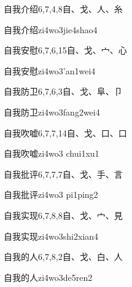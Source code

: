 \begin{Entry}{自我介绍}{6,7,4,8}{⾃、⼽、⼈、⽷}
  \begin{Phonetics}{自我介绍}{zi4wo3jie4shao4}
  \end{Phonetics}
\end{Entry}

\begin{Entry}{自我安慰}{6,7,6,15}{⾃、⼽、⼧、⼼}
  \begin{Phonetics}{自我安慰}{zi4wo3'an1wei4}
  \end{Phonetics}
\end{Entry}

\begin{Entry}{自我防卫}{6,7,6,3}{⾃、⼽、⾩、⼙}
  \begin{Phonetics}{自我防卫}{zi4wo3fang2wei4}
  \end{Phonetics}
\end{Entry}

\begin{Entry}{自我吹嘘}{6,7,7,14}{⾃、⼽、⼝、⼝}
  \begin{Phonetics}{自我吹嘘}{zi4wo3 chui1xu1}
  \end{Phonetics}
\end{Entry}

\begin{Entry}{自我批评}{6,7,7,7}{⾃、⼽、⼿、⾔}
  \begin{Phonetics}{自我批评}{zi4wo3 pi1ping2}
  \end{Phonetics}
\end{Entry}

\begin{Entry}{自我实现}{6,7,8,8}{⾃、⼽、⼧、⾒}
  \begin{Phonetics}{自我实现}{zi4wo3shi2xian4}
  \end{Phonetics}
\end{Entry}

\begin{Entry}{自我的人}{6,7,8,2}{⾃、⼽、⽩、⼈}
  \begin{Phonetics}{自我的人}{zi4wo3de5ren2}
  \end{Phonetics}
\end{Entry}

